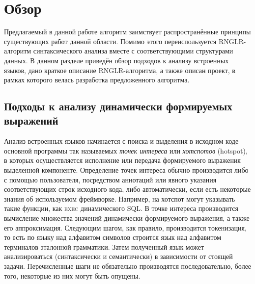 \section{Обзор}
Предлагаемый в данной работе алгоритм заимствует распространённые принципы существующих работ данной области. Помимо этого переиспользуется RNGLR-алгоритм синтаксического анализа вместе с соответствующими структурами данных. В данном разделе приведён обзор подходов к анализу встроенных языков, дано краткое описание RNGLR-алгоритма, а также описан проект, в рамках которого велась разработка предложенного алгоритма.

\subsection{Подходы к анализу динамически формируемых выражений}
Анализ встроенных языков начинается с поиска и выделения в исходном коде основной программы так называемых \emph{точек интереса} или \emph{хотспотов} (hotspot), в которых осуществляется исполнение или передача формируемого выражения выделенной компоненте. Определение точек интереса обычно производится либо с помощью пользователя, посредством аннотаций или явного указания соответствующих строк исходного кода, либо автоматически, если есть некоторые знания об используемом фреймворке. Например, на хотспот могут указывать такие функции, как \textsc{exec} динамического SQL. В точке интереса производится вычисление множества значений динамически формируемого выражения, а также его аппроксимация. Следующим шагом, как правило, производится токенизация, то есть по языку над алфавитом символов строится язык над алфавитом терминалов эталонной грамматики. Затем полученный язык может анализироваться (синтаксически и семантически) в зависимости от стоящей задачи. Перечисленные шаги не обязательно производятся последовательно, более того, некоторые из них могут быть опущены. 

